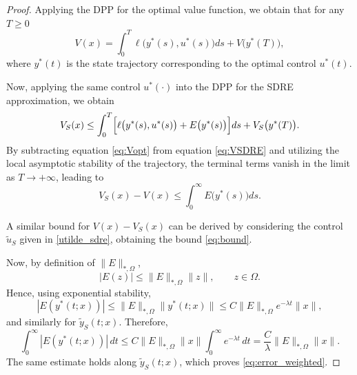 \documentclass{article}
\begin{document}
\begin{proof}


Applying the DPP for the optimal value function, we obtain that for any \(T\ge 0\)
\begin{equation}\label{eq:Vopt}
V(x)=\int_0^T \ell\bigl(y^*(s),u^*(s)\bigr)ds+V\bigl(y^*(T)\bigr),
\end{equation}
where \(y^*(t)\) is the state trajectory corresponding to the optimal control \(u^*(t)\).

Now, applying the same control \(u^*(\cdot)\) into the DPP for the SDRE approximation, we obtain
\begin{equation}\label{eq:VSDRE}
V_S(x)\le \int_0^T \Bigl[\ell\bigl(y^*(s),u^*(s)\bigr)+E\bigl(y^*(s)\bigr)\Bigr]ds+V_S\bigl(y^*(T)\bigr).
\end{equation}
By subtracting equation \eqref{eq:Vopt} from equation \eqref{eq:VSDRE} and utilizing the local asymptotic stability of the trajectory, the terminal terms vanish in the limit as $T \rightarrow + \infty$, leading to
\[
V_S(x)-V(x)\le \int_0^\infty E\bigl(y^*(s)\bigr)ds.
\]

A similar bound for $V(x)-V_S(x)$ can be derived by considering the control $\tilde{u}_{S}$ given in \eqref{utilde_sdre}, obtaining the bound \eqref{eq:bound}.


Now, by definition of $\|E\|_{*,\Omega}$,
\[
|E(z)|\le \|E\|_{*,\Omega}\|z\|,
\qquad z\in\Omega.
\]
Hence, using exponential stability,
\[
|E(y^*(t;x))|
\le
\|E\|_{*,\Omega}\|y^*(t;x)\|
\le
C \|E\|_{*,\Omega} e^{-\lambda t}\|x\|,
\]
and similarly for $\tilde y_S(t;x)$. Therefore,
\[
\int_0^\infty |E(y^*(t;x))|\,dt
\le
C \|E\|_{*,\Omega}\|x\|
\int_0^\infty e^{-\lambda t}\,dt
=
\frac{C}{\lambda}\|E\|_{*,\Omega}\|x\|.
\]
The same estimate holds along $\tilde y_S(t;x)$, which proves
\eqref{eq:error_weighted}.

 
\end{proof}
\end{document}
